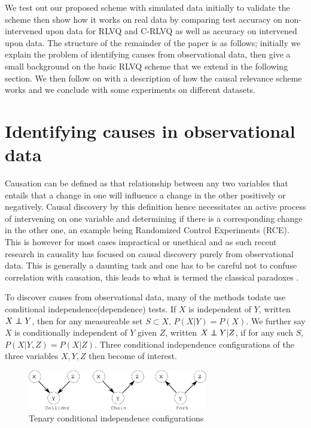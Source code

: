 \documentclass{esannV2}
\newcommand\independent{\protect\mathpalette{\protect\independenT}{\perp}}
\def\independenT#1#2{\mathrel{\rlap{$#1#2$}\mkern2mu{#1#2}}}
\def\ci{\independent}
\begin{document}
We test out our proposed scheme with simulated data initially to validate the scheme then show how it works on real data by comparing test accuracy on non-intervened upon data for RLVQ and C-RLVQ as well as accuracy on intervened upon data. The structure of the remainder of the paper is as follows; initially we explain the problem of identifying causes from observational data, then give a small background on the basic RLVQ scheme that we extend in the following section. We then follow on with a description of how the causal relevance scheme works and we conclude with some experiments on different datasets.

\section{Identifying causes in observational data}
\label{sec:IdentifyingCausesInObservationalData}

Causation can be defined as that relationship between any two variables that entails that a change in one will influence a change in the other positively or negatively. Causal discovery by this definition hence necessitates an active process of intervening on one variable and determining if there is a corresponding change in the other one, an example being Randomized Control Experiments (RCE). This is however for most cases impractical or unethical and as such recent research in causality has focused on causal discovery purely from observational data. This is generally a daunting task and one has to be careful not to confuse correlation with causation, this leads to what is termed the classical paradoxes \cite{06}.

To discover causes from observational data, many of the methods todate use conditional independence(dependence) tests. If $X$ is independent of $Y$, written $X \ci Y$, then for any measureable set $S \subset X$, $P(X|Y) = P(X)$. We further say $X$ is conditionally independent of $Y$ given $Z$, written $X \ci Y | Z$, if for any such $S$, $P(X|Y,Z) = P(X|Z)$. Three conditional independence configurations of the three variables $X,Y,Z$ then become of interest. 

\begin{figure}[!h]
	\centering
		\includegraphics[width=0.70\textwidth]{vstructure.eps}
	\caption{Tenary conditional independence configurations}
	\label{fig:vstructure}
\end{figure}
\end{document}
